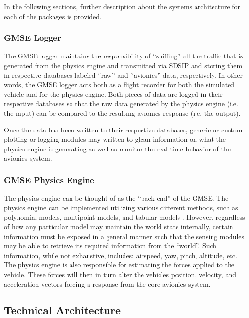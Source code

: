 In the following sections, further description about the systems architecture for each of the
packages is provided.

\subsubsection{GMSE Logger}

The GMSE logger maintains the responsibility of ``sniffing'' all the traffic that is generated from
the physics engine and transmitted via SDSIP and storing them in respective databases labeled
``raw'' and ``avionics'' data, respectively. In other words, the GMSE logger acts both as a flight
recorder for both the simulated vehicle and for the physics engine. Both pieces of data are logged
in their respective databases so that the raw data generated by the physics engine (i.e. the input)
can be compared to the resulting avionics response (i.e. the output).

Once the data has been written to their respective databases, generic or custom plotting or logging
modules may written to glean information on what the physics engine is generating as well as monitor
the real-time behavior of the avionics system.

\subsubsection{GMSE Physics Engine}

The physics engine can be thought of as the ``back end'' of the GMSE. The physics engine can be
implemented utilizing various different methods, such as polynomial models, multipoint models, and
tabular models \cite{banks_discussion_nodate}. However, regardless of how any particular model may
maintain the world state internally, certain information must be exposed in a general manner such
that the sensing modules may be able to retrieve its required information from the ``world''. Such
information, while not exhaustive, includes: airspeed, yaw, pitch, altitude, etc. The physics engine
is also responsible for estimating the forces applied to the vehicle. These forces will then in turn
alter the vehicles position, velocity, and acceleration vectors forcing a response from the core
avionics system.

\subsection{Technical Architecture} \label{sec:technical-architecture}


